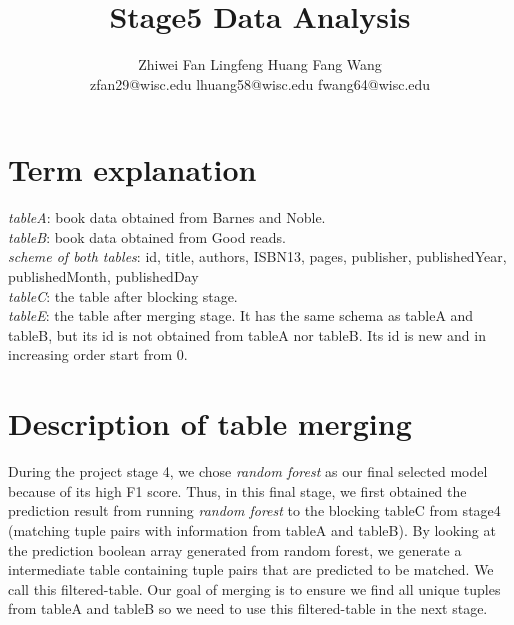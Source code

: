 \documentclass[10pt, oneside]{article}
\title{\textbf{Stage5 Data Analysis}}
\author{Zhiwei Fan\hspace{7ex}
	   Lingfeng Huang\hspace{7ex}
	   Fang Wang\\
	   zfan29@wisc.edu\hspace{3ex}
	   lhuang58@wisc.edu\hspace{3ex}
	   fwang64@wisc.edu
	   }
\begin{document}
\maketitle 

\section*{Term explanation}
\textit{tableA}: book data obtained from Barnes and Noble.\\ 
\textit{tableB}: book data obtained from Good reads. \\ 
\textit{scheme of both tables}: id, title,	authors, ISBN13,	pages,	publisher,	publishedYear,  publishedMonth, publishedDay\\
\textit{tableC}: the table after blocking stage.\\ 
\textit{tableE}: the table after merging stage. It has the same schema as tableA and tableB, but its id is not obtained from tableA nor tableB. Its id is new and in increasing order start from 0.

\section*{Description of table merging}
During the project stage 4, we chose \textit{random forest} as our final selected model because of its high F1 score.  
Thus, in this final stage, we first obtained the prediction result from running \textit{random forest} to the blocking tableC from stage4 (matching tuple pairs with information from tableA and tableB). By looking at the prediction boolean array generated from random forest, we generate a intermediate table containing tuple pairs that are predicted to be matched. We call this filtered-table. Our goal of merging is to ensure we find all unique tuples from tableA and tableB so we need to use this filtered-table in the next stage.
\end{document}
